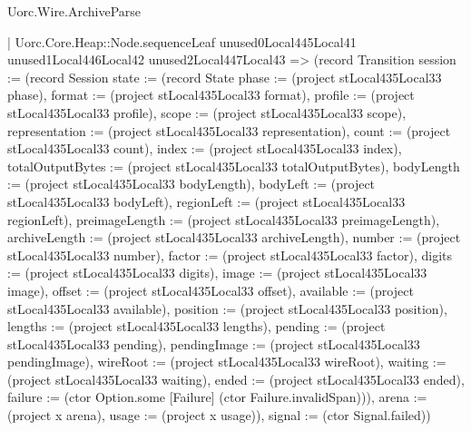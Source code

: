 \begin{lexlean}{Uorc.Wire.ArchiveParse}
\begin{semanticmodule}
{        | Uorc.Core.Heap::Node.sequenceLeaf unused0Local445Local41 unused1Local446Local42 unused2Local447Local43 => (record Transition {session := (record Session {state := (record State {phase := (project stLocal435Local33 phase), format := (project stLocal435Local33 format), profile := (project stLocal435Local33 profile), scope := (project stLocal435Local33 scope), representation := (project stLocal435Local33 representation), count := (project stLocal435Local33 count), index := (project stLocal435Local33 index), totalOutputBytes := (project stLocal435Local33 totalOutputBytes), bodyLength := (project stLocal435Local33 bodyLength), bodyLeft := (project stLocal435Local33 bodyLeft), regionLeft := (project stLocal435Local33 regionLeft), preimageLength := (project stLocal435Local33 preimageLength), archiveLength := (project stLocal435Local33 archiveLength), number := (project stLocal435Local33 number), factor := (project stLocal435Local33 factor), digits := (project stLocal435Local33 digits), image := (project stLocal435Local33 image), offset := (project stLocal435Local33 offset), available := (project stLocal435Local33 available), position := (project stLocal435Local33 position), lengths := (project stLocal435Local33 lengths), pending := (project stLocal435Local33 pending), pendingImage := (project stLocal435Local33 pendingImage), wireRoot := (project stLocal435Local33 wireRoot), waiting := (project stLocal435Local33 waiting), ended := (project stLocal435Local33 ended), failure := (ctor Option.some [Failure] (ctor Failure.invalidSpan))}), arena := (project x arena), usage := (project x usage)}), signal := (ctor Signal.failed)})
}
\end{semanticmodule}
\end{lexlean}

